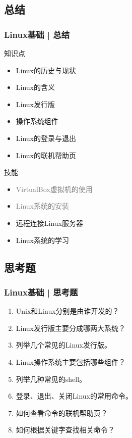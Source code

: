 \subsection{总结}
\begin{frame}
  \frametitle{Linux基础 | 总结}
  \begin{block}{知识点}
    \begin{itemize}
      \item Linux的历史与现状
      \item Linux的含义
      \item Linux发行版
      \item 操作系统组件
      \item Linux的登录与退出
      \item Linux的联机帮助页
    \end{itemize}
  \end{block}
  \begin{block}{技能}
    \begin{itemize}
      \item \textcolor{gray}{VirtualBox虚拟机的使用}
      \item \textcolor{gray}{Linux系统的安装}
      \item 远程连接Linux服务器
      \item Linux系统的学习
    \end{itemize}
  \end{block}
\end{frame}

\subsection{思考题}
\begin{frame}
  \frametitle{Linux基础 | 思考题}
  \begin{enumerate}
    \item Unix和Linux分别是由谁开发的？
    \item Linux发行版主要分成哪两大系统？
    \item 列举几个常见的Linux发行版。
    \item Linux操作系统主要包括哪些组件？
    \item 列举几种常见的shell。
    \item 登录、退出、关闭Linux的常用命令。
    \item 如何查看命令的联机帮助页？
    \item 如何根据关键字查找相关命令？
  \end{enumerate}
\end{frame}


